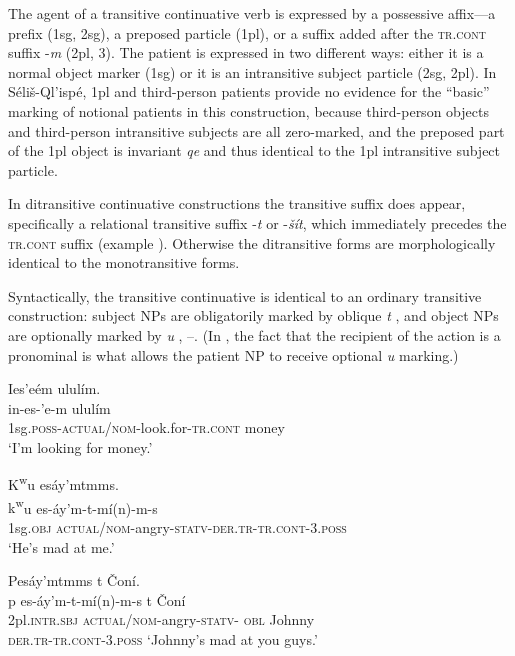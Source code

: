 \documentclass[output=paper,colorlinks,citecolor=brown]{langscibook}
\begin{document}
The agent of a transitive continuative verb is expressed by a
possessive affix---a prefix (1sg, 2sg), a preposed particle (1pl),
or a suffix added after the \textsc{tr.cont} suffix -\emph{m} (2pl,
3).  The patient is expressed in two different ways: either it is a
normal object marker (1sg) or it is an intransitive subject particle
(2sg, 2pl).  In S\'eli\v{s}-Ql'isp\'e, 1pl and third-person patients
provide no evidence for the ``basic'' marking of notional patients in
this construction, because third-person objects and third-person
intransitive subjects are all zero-marked, and the preposed part of
the 1pl object is invariant \emph{qe} and thus identical to the 1pl
intransitive subject particle.

In ditransitive continuative constructions the transitive suffix does
appear, specifically a relational transitive suffix -\emph{{\textltilde}t} or -\emph{\v{s}\'it}, which immediately precedes the
\textsc{tr.cont} suffix (example ).  Otherwise the ditransitive forms
are morphologically identical to the monotransitive forms.

Syntactically, the transitive continuative is identical to an ordinary
transitive construction: subject NPs are obligatorily marked by
oblique \emph{t} ,  and object NPs are optionally marked by \emph{{\textltilde}u} , --.  (In , the fact that the recipient of
the action is a pronominal is what allows the patient NP to receive
optional \emph{{\textltilde}u} marking.)

\ea 
\label{ex-thomason-24}
Ies{\textcrlambda}'e\textglotstop\'em ulul\'im.  \\
\gll in-es-{\textcrlambda}'e\textglotstop-m ulul\'im \\
1sg.\textsc{poss}-\textsc{actual/nom}-look.for-\textsc{tr.cont} money \\
\glt `I'm looking for money.'
\z

\ea 
\label{ex-thomason-25}
{K\textsuperscript w}u es\'ay'mtmms. \\
\gll  
{k\textsuperscript w}u es-\textrevglotstop\'ay'm-t-m\'i(n)-m-s \\
1sg.\textsc{obj} \textsc{actual/nom}-angry-\textsc{statv-der.tr-tr.cont}-3.\textsc{poss} \\
\glt `He's mad at me.'
\z

\ea 
\label{ex-thomason-26}
Pes\'ay'mtmms t \v{C}on\'i.  \\
\gll p es-\textrevglotstop\'ay'm-t-m\'i(n)-m-s t \v{C}on\'i \\
2pl.\textsc{intr.sbj} \textsc{actual/nom}-angry-\textsc{statv-}
 \textsc{obl} Johnny \\
\textsc{der.tr-tr.cont}-3.\textsc{poss}
\glt `Johnny's mad at you guys.' 
\z
\end{document}
